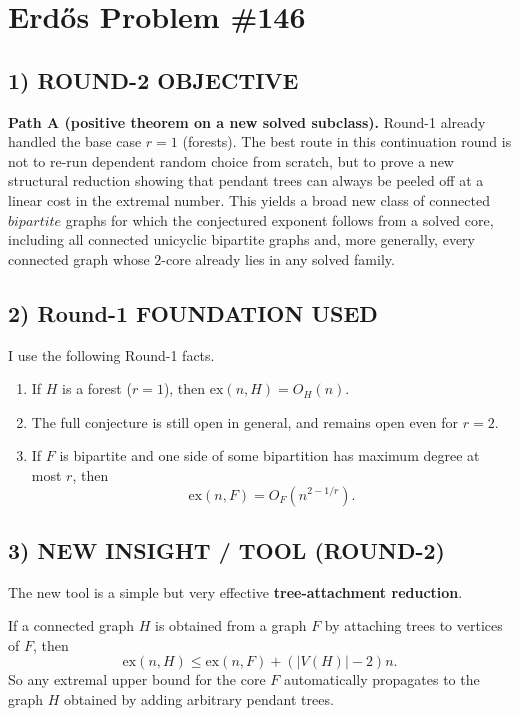 
\section*{Erd\H{o}s Problem \#146}

\subsection*{1) ROUND-2 OBJECTIVE}

\textbf{Path A (positive theorem on a new solved subclass).} Round-1 already handled the base case
$r=1$ (forests). The best route in this continuation round is not to re-run dependent random choice
from scratch, but to prove a new structural reduction showing that pendant trees can always be
peeled off at a linear cost in the extremal number. This yields a broad new class of connected
$bipartite$ graphs for which the conjectured exponent follows from a solved core, including all
connected unicyclic bipartite graphs and, more generally, every connected graph whose $2$-core
already lies in any solved family.

\subsection*{2) Round-1 FOUNDATION USED}

I use the following Round-1 facts.

\begin{enumerate}
\item If $H$ is a forest ($r=1$), then $\mathrm{ex}(n,H)=O_H(n)$.
\item The full conjecture is still open in general, and remains open even for $r=2$.
\item If $F$ is bipartite and one side of some bipartition has maximum degree at most $r$, then
\[
\mathrm{ex}(n,F)=O_F(n^{2-1/r}).
\]
\end{enumerate}

\subsection*{3) NEW INSIGHT / TOOL (ROUND-2)}

The new tool is a simple but very effective \textbf{tree-attachment reduction}.

If a connected graph $H$ is obtained from a graph $F$ by attaching trees to vertices of $F$, then
\[
\mathrm{ex}(n,H)\le \mathrm{ex}(n,F)+(|V(H)|-2)n.
\]
So any extremal upper bound for the core $F$ automatically propagates to the graph $H$ obtained by
adding arbitrary pendant trees.


